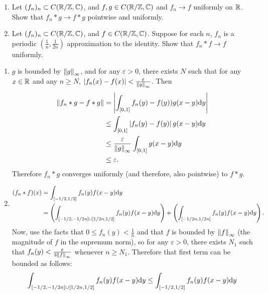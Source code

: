 \documentclass{article}
\begin{document}
\bigskip
\begin{prob}
    \begin{enumerate}[label=(\alph*)]
        \item Let $(f_n)_n \subset C(\mathbb{R}/\mathbb{Z}, \mathbb{C})$, and $f,g \in C(\mathbb{R}/\mathbb{Z},\mathbb{C})$ and $f_n \rightarrow f$ uniformly on $\mathbb{R}$. Show that $f_n * g \rightarrow f*g$ pointwise and uniformly.
        \item Let $(f_n)_n \subset C(\mathbb{R}/\mathbb{Z}, \mathbb{C})$, and $f \in C(\mathbb{R}/\mathbb{Z},\mathbb{C})$. Suppose for each $n$, $f_n$ is a periodic $ \left( \frac{1}{n}, \frac{1}{2n} \right) $ approximation to the identity. Show that $f_n * f \rightarrow f$ uniformly.
    \end{enumerate}
\end{prob}
\begin{enumerate}[label=(\alph*)]
    \item $g$ is bounded by $\left\lVert g\right\rVert_\infty$, and for any $\varepsilon > 0$, there exists $N$ such that for any $x \in \mathbb{R}$ and any $n \geq N$, $\left\lvert f_n(x)-f(x) \right\rvert < \frac{\varepsilon}{\left\lVert g\right\rVert_\infty}$. Then \begin{align*}
            \left\lVert f_n*g-f*g\right\rVert &= \left\lvert \int_{[0,1]} f_n(y)-f(y))g(x-y) \mathrm{d} y \right\rvert \\
                             &\leq \int_{[0,1]} \left\lvert f_n(y)-f(y) \right\rvert g(x-y) \mathrm{d} y \\
                             &\leq \frac{\varepsilon}{\left\lVert g\right\rVert_\infty} \int_{[0,1]} g(x-y) \mathrm{d} y \\
                             &\leq \varepsilon.
    \end{align*}
    Therefore $f_n*g$ converges uniformly (and therefore, also pointwise) to $f*g$.
    \item \begin{align*}
            (f_n*f)(x) &= \int_{[-1/2,1/2]} f_n(y)f(x-y) \mathrm{d} y \\
                       &= \left( \int_{[-1/2,-1/2n]\cup[1/2n,1/2]} f_n(y)f(x-y) \mathrm{d} y \right) + \left( \int_{[-1/2n,1/2n]} f_n(y)f(x-y) \mathrm{d} y \right).
    \end{align*}
    Now, use the facts that $0 \leq f_n(y) < \frac{1}{n}$ and that $f$ is bounded by $\left\lVert f\right\rVert_\infty$ (the magnitude of $f$ in the supremum norm), so for any $\varepsilon > 0$, there exists $N_1$ such that $f_n(y) < \frac{\varepsilon}{3 \left\lVert f\right\rVert_\infty}$ whenever $n \geq N_1$. Therefore that first term can be bounded as follows:
    \begin{align*}
        \int_{[-1/2,-1/2n]\cup[1/2n,1/2]} f_n(y)f(x-y) \d y &\leq \int_{[-1/2,1/2]} f_n(y) f(x-y) \d y \\

\end{align*}
\end{enumerate}
\end{document}

